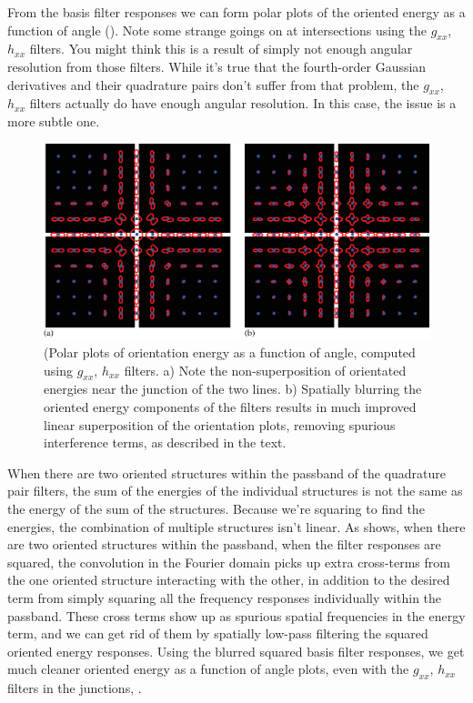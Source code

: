 From the basis filter responses we can form polar plots of
the oriented energy as a function of angle (\fig{\ref{fig:multioriflorets}}).
Note some strange goings on at intersections using the $g_{xx}$, $h_{xx}$
filters.  You might think this is a result of simply not enough
angular resolution from those filters. While it's true that the fourth-order Gaussian derivatives and their quadrature
pairs don't suffer from that problem, the $g_{xx}$, $h_{xx}$ filters
actually do have enough angular resolution. In this case, the issue is a more subtle
one.   


\begin{figure}[t]
\centerline{
\includegraphics[width=1\linewidth]{figures/spatial_filter_sets/steer_quad_polarplot_cross.eps}
}
\caption{(Polar plots of orientation energy as a
  function of angle, computed using $g_{xx}$, $h_{xx}$ filters.  a) Note the
  non-superposition of orientated energies near the junction of the
  two lines.  b) Spatially blurring the oriented energy components of
  the filters results in much improved linear superposition of
  the orientation plots, removing spurious interference terms, as
  described in the text.}
\label{fig:multioriflorets}
\end{figure}


When there are two oriented structures within the passband
of the quadrature pair filters, the sum of the energies of the
individual structures is not the same as the energy of the sum of the
structures.  Because we're squaring to find the energies, the
combination of multiple structures isn't linear.   As 
shows, when there are two oriented structures within the passband,
when the filter responses are squared, the convolution in the Fourier
domain picks up extra cross-terms from the one oriented structure
interacting with the other, in addition to the desired term from
simply squaring all the frequency responses individually within the
passband.  These cross terms show up as spurious spatial frequencies
in the energy term, and we can get rid of them by spatially low-pass
filtering the squared oriented energy responses.  Using the blurred
squared basis filter responses, we get much cleaner oriented energy as
a function of angle plots, even with the $g_{xx}$, $h_{xx}$ filters in
the junctions, .

